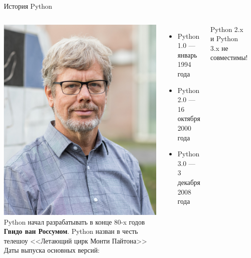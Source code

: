 \documentclass[12pt]{beamer}
\begin{document}
\begin{frame}{История Python}
\begin{columns}[onlytextwidth,T]
    \column{30mm}
	\includegraphics[scale=0.7]{image/Guido_van_Rossum.jpg}
    \column{\dimexpr\linewidth-30mm-20mm}
    Python начал разрабатывать в конце 80-x годов \textbf{Гвидо ван Россумом}. Python назван в честь телешоу <<Летающий цирк Монти Пайтона>> \\
    \vspace{0.3cm}
    Даты выпуска основных версий:
	\begin{itemize}
    	\item Python 1.0 — январь 1994 года
    	\item Python 2.0 — 16 октября 2000 года
    	\item Python 3.0 — 3 декабря 2008 года   	    	
    \end{itemize}           
    \vspace{0.3cm}
    Python 2.x и Python 3.x не совместимы!
    \end{columns}  
\end{frame}
\end{document}
